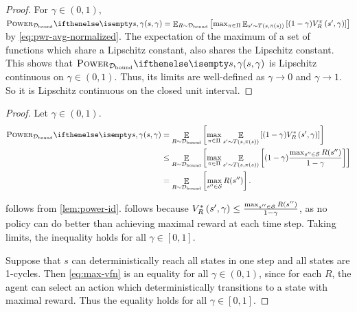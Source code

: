 \documentclass{article}
\newcommand*{\prn}[1]{\left(#1\right)}
\newcommand*{\brx}[1]{\left[#1\right]}
\newcommand*{\St}{\mathcal{S}}
\newcommand{\stateEnd}{1-cycle}
\newcommand*{\D}{\mathcal{D}} %
\newcommand*{\Dbd}{\D_{\text{bound}}}
\DeclareMathOperator*{\opE}{\mathbb{E}}
\newcommand*{\E}[2]{\opE_{#1}\brx{#2}} %
\newcommand*{\geom}[1][1]{\frac{#1}{1-\gamma}}
\theoremstyle{definition}
\begin{document}
\begin{appendices}
\begin{proof}
For $\gamma\in(0,1)$, $\pwr[s,\gamma] = \E{R\sim\Dbd}{\max_{\pi\in\Pi} \E{s'\sim T\prn{s,\pi(s)}}{(1-\gamma)V^\pi_R\prn{s',\gamma}}}$ by \cref{eq:pwr-avg-normalized}. The expectation of the maximum of a set of functions which share a Lipschitz constant, also shares the Lipschitz constant. This shows that $\pwr[s,\gamma]$ is Lipschitz continuous on $\gamma\in(0,1)$. Thus, its limits are well-defined as $\gamma\to 0$ and $\gamma\to 1$. So it is Lipschitz continuous on the closed unit interval.
\end{proof}

\maxPwrGeneral*
\begin{proof}
Let $\gamma \in (0,1)$.
\begin{align}
    \pwr[s,\gamma][\Dbd]&= \E{R\sim \Dbd}{\max_{\pi\in\Pi} \E{s'\sim T(s,\pi(s))}{(1-\gamma)\OptVf{s',\gamma}}}\label{eq:pwr-id}\\
    &\leq \E{R\sim \Dbd}{\max_{\pi\in\Pi} \E{s'\sim T(s,\pi(s))}{(1-\gamma)\geom[\max_{s''\in\St}R(s'')]}}\label{eq:max-vfn}\\
    &= \E{R\sim \Dbd}{\max_{s''\in\St}R(s'')}.
\end{align}

 follows from \cref{lem:power-id}.  follows because $\OptVf{s',\gamma}\leq \geom[\max_{s''\in\St}R(s'')]$, as no policy can do better than achieving maximal reward at each time step. Taking limits, the inequality holds for all $\gamma\in[0,1]$.

Suppose that $s$ can deterministically reach all states in one step and all states are {\stateEnd}s. Then \cref{eq:max-vfn} is an equality for all $\gamma\in(0,1)$, since for each $R$, the agent can select an action which deterministically transitions to a state with maximal reward. Thus the equality holds for all $\gamma\in[0,1]$.
\end{proof}


\end{appendices}
\end{document}
